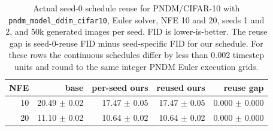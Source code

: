 \begin{table}[t]
  \centering
  \caption{Actual seed-0 schedule reuse for PNDM/CIFAR-10 with
  \texttt{pndm\_model\_ddim\_cifar10}, Euler solver, NFE 10 and 20,
  seeds 1 and 2, and 50k generated images per seed. FID is
  lower-is-better. The reuse gap is seed-0-reuse FID minus seed-specific
  FID for our schedule. For these rows the continuous schedules differ by
  less than 0.002 timestep units and round to the same integer
  PNDM Euler execution grids.}
  \label{tab:cifar10-pndm-euler-50k-reuse-seed0-schedule}
  \begin{tabular}{rrrrr}
    \toprule
    NFE & base & per-seed ours & reused ours & reuse gap \\
    \midrule
    10 & 20.49 $\pm$ 0.02 & 17.47 $\pm$ 0.05 & 17.47 $\pm$ 0.05 & 0.000 $\pm$ 0.000 \\
    20 & 11.10 $\pm$ 0.02 & 10.64 $\pm$ 0.02 & 10.64 $\pm$ 0.02 & 0.000 $\pm$ 0.000 \\
    \bottomrule
  \end{tabular}
\end{table}
